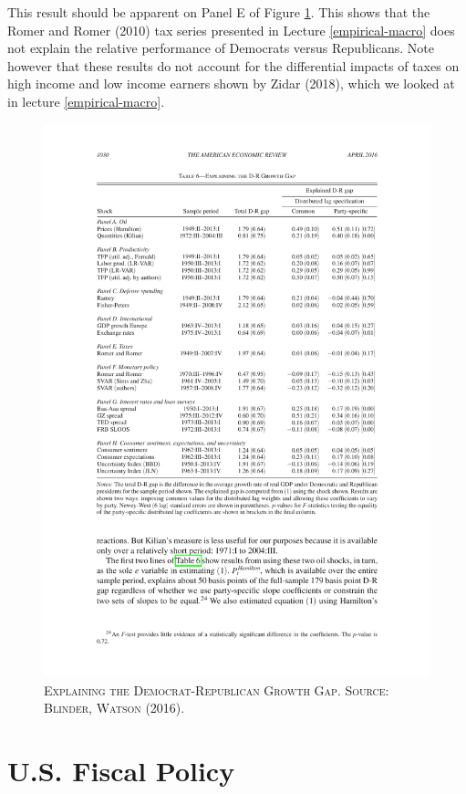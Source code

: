 \documentclass[]{book}
\begin{document}
This result should be apparent on Panel E of Figure
\ref{fig:BlinderWatson2016-table6}. This shows that the Romer and Romer
(2010) tax series presented in Lecture \ref{empirical-macro} does not
explain the relative performance of Democrats versus Republicans. Note
however that these results do not account for the differential impacts
of taxes on high income and low income earners shown by Zidar (2018),
which we looked at in lecture \ref{empirical-macro}.




\begin{figure}

{\centering \includegraphics[width=0.8\linewidth,height=0.8\textheight]{figures/BlinderWatson2016/table6} 

}

\caption{\textsc{Explaining the
Democrat-Republican Growth Gap. Source: Blinder, Watson (2016).}}\label{fig:BlinderWatson2016-table6}
\end{figure}

\section{U.S. Fiscal Policy}\label{conclusion-fiscal-policy}
\end{document}
